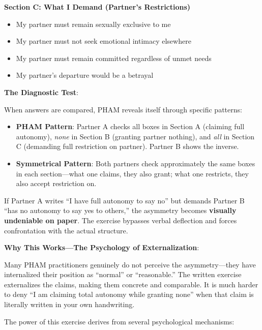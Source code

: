 \documentclass[12pt,openany]{book}
\numberwithin{equation}{chapter}
\begin{document}
\begin{center}
{\begin{minipage}{5.5in}
\vspace{0.5em}
\textbf{Section C: What I Demand (Partner's Restrictions)}
\begin{itemize}
    \item[$\square$] My partner must remain sexually exclusive to me
    \item[$\square$] My partner must not seek emotional intimacy elsewhere
    \item[$\square$] My partner must remain committed regardless of unmet needs
    \item[$\square$] My partner's departure would be a betrayal
\end{itemize}
\end{minipage}
}
\end{center}

\textbf{The Diagnostic Test}:

When answers are compared, PHAM reveals itself through specific patterns:

\begin{itemize}
    \item \textbf{PHAM Pattern}: Partner A checks all boxes in Section A (claiming full autonomy), \textit{none} in Section B (granting partner nothing), and \textit{all} in Section C (demanding full restriction on partner). Partner B shows the inverse.
    
    \item \textbf{Symmetrical Pattern}: Both partners check approximately the same boxes in each section---what one claims, they also grant; what one restricts, they also accept restriction on.
\end{itemize}

If Partner A writes ``I have full autonomy to say no'' but demands Partner B ``has no autonomy to say yes to others,'' the asymmetry becomes \textbf{visually undeniable on paper}. The exercise bypasses verbal deflection and forces confrontation with the actual structure.

\textbf{Why This Works---The Psychology of Externalization}:

Many PHAM practitioners genuinely do not perceive the asymmetry---they have internalized their position as ``normal'' or ``reasonable.'' The written exercise externalizes the claims, making them concrete and comparable. It is much harder to deny ``I am claiming total autonomy while granting none'' when that claim is literally written in your own handwriting.

The power of this exercise derives from several psychological mechanisms:
\end{document}
